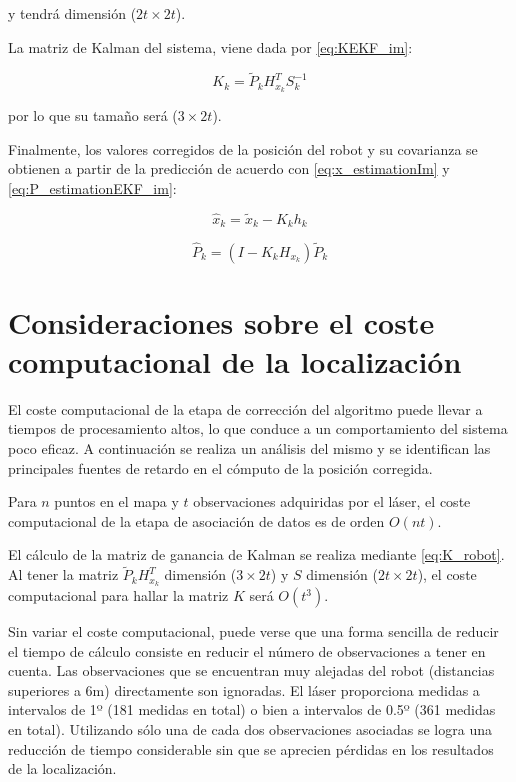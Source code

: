 y tendrá dimensión ($2t \times 2t$).

La matriz de Kalman del sistema, viene dada por \ref{eq:KEKF_im}:

\begin{equation}\label{eq:K_robot}
    K_{k} = \tilde{P}_{k}H_{x_{k}}^{T}S_{k}^{-1}
\end{equation}

por lo que su tamaño será ($3 \times 2t$).

Finalmente, los valores corregidos de la posición del robot y su covarianza se obtienen a partir de la predicción de acuerdo con \ref{eq:x_estimationIm} y \ref{eq:P_estimationEKF_im}:

\begin{equation}\label{eq:x_robot}
    \hat{x}_{k} = \tilde{x}_{k} - K_{k}h_{k}
\end{equation}

\begin{equation}\label{eq:P_robot}
    \hat{P}_{k} = (I-K_{k}H_{x_{k}})\tilde{P}_{k}
\end{equation}


\section{Consideraciones sobre el coste computacional de la localización} \label{computacional}

El coste computacional de la etapa de corrección del algoritmo puede llevar a tiempos de procesamiento altos, lo que conduce a un comportamiento del sistema poco eficaz. A continuación se realiza un análisis del mismo y se identifican las principales fuentes de retardo en el cómputo de la posición corregida.

Para $n$ puntos en el mapa y $t$ observaciones adquiridas por el láser, el coste computacional de la etapa de asociación de datos es de orden $O(nt)$.

El cálculo de la matriz de ganancia de Kalman se realiza mediante \ref{eq:K_robot}. Al tener la matriz $\tilde{P}_{k}H_{x_{k}}^{T}$ dimensión ($3 \times 2t$) y $S$ dimensión ($2t \times 2t$), el coste computacional para hallar la matriz $K$ será $O(t^{3})$.

Sin variar el coste computacional, puede verse que una forma sencilla de reducir el tiempo de cálculo consiste en reducir el número de observaciones a tener en cuenta. Las observaciones que se encuentran muy alejadas del robot (distancias superiores a 6m) directamente son ignoradas. El láser proporciona medidas a intervalos de 1º (181 medidas en total) o bien a intervalos de 0.5º (361 medidas en total). Utilizando sólo una de cada dos observaciones asociadas se logra una reducción de tiempo considerable sin que se aprecien pérdidas en los resultados de la localización.

